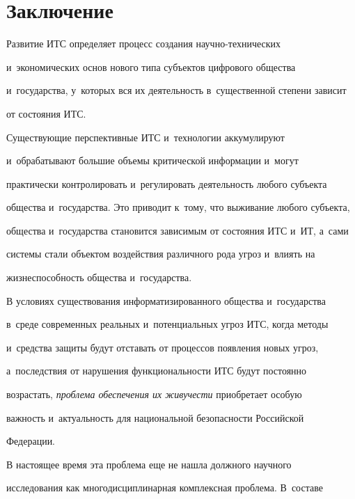   


  \section{Заключение}


  


  Развитие ИТС определяет процесс создания на\-уч\-но-тех\-ни\-че\-ских 


и~экономических основ нового типа субъектов цифрового общества 


и~государства, у~которых вся их деятельность в~существенной степени зависит 


от состояния ИТС.


  


  Существующие перспективные ИТС и~технологии аккумулируют 


и~обрабатывают большие объемы критической информации и~могут 


практически контролировать и~регулировать деятельность любого субъекта 


общества и~государства. Это приводит к~тому, что выживание любого субъекта, 


общества и~государства становится зависимым от состояния ИТС и~ИТ, а~сами 


сис\-те\-мы стали объектом воздействия различного рода угроз и~влиять на 


жизнеспособность общества и~государства.


  


  В условиях существования информатизированного общества и~государства 


в~среде современных реальных и~потенциальных угроз ИТС, когда методы 


и~средства защиты будут отставать от процессов появления новых угроз, 


а~последствия от нарушения функциональности ИТС будут постоянно 


возрастать, \textit{проблема обеспечения их живучести} приобретает особую 


важность и~актуальность для национальной безопасности Российской 


Федерации.


  


  В настоящее время эта проблема еще не нашла должного научного 


исследования как многодисциплинарная комплексная проблема. В~составе 


